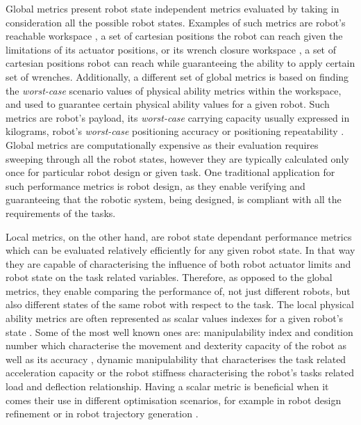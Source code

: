 Global metrics present robot state independent metrics evaluated by taking in consideration all the possible robot states. Examples of such metrics are robot's reachable workspace \cite{Zacharias2007,Vahrenkamp2016,kucuk2005robot}, a set of cartesian positions the robot can reach given the limitations of its actuator positions, or its wrench closure workspace \cite{gouttefarde2006determination,Lau2011}, a set of cartesian positions robot can reach while guaranteeing the ability to apply certain set of wrenches. Additionally, a different set of global metrics is based on finding the \textit{worst-case} scenario values of physical ability metrics within the workspace, and used to guarantee certain physical ability values for a given robot. Such metrics are robot's payload, its \textit{worst-case} carrying capacity usually expressed in kilograms, robot's \textit{worst-case} positioning accuracy or positioning repeatability \cite{russo2022measuring}. Global metrics are computationally expensive as their evaluation requires sweeping through all the robot states, however they are typically calculated only once for particular robot design or given task.
One traditional application for such performance metrics is robot design, as they enable verifying and guaranteeing that the robotic system, being designed, is compliant with all the requirements of the tasks. 

Local metrics, on the other hand, are robot state dependant performance metrics which can be evaluated relatively efficiently for any given robot state. In that way they are capable of characterising the influence of both robot actuator limits and robot state on the task related variables. Therefore, as opposed to the global metrics, they enable comparing the performance of, not just different robots, but also different states of the same robot with respect to the task. The local physical ability metrics are often represented as scalar values indexes for a given robot's state \cite{Patel2015}. Some of the most well known ones are: manipulability index \cite{yoshikawa_manipulability_1985} and condition number \cite{Gosselin1991} which characterise the movement and dexterity capacity of the robot as well as its accuracy \cite{merlet_jacobian_2006}, dynamic manipulability \cite{yoshikawa1985dynamic} that characterises the task related acceleration capacity or the robot stiffness \cite{PASHKEVICH2011662} characterising the robot's tasks related load and deflection relationship.
Having a scalar metric is beneficial when it comes their use in different optimisation scenarios, for example in robot design refinement \cite{kucuk2005robot} or in robot trajectory generation \cite{Guilamo2006}. 

